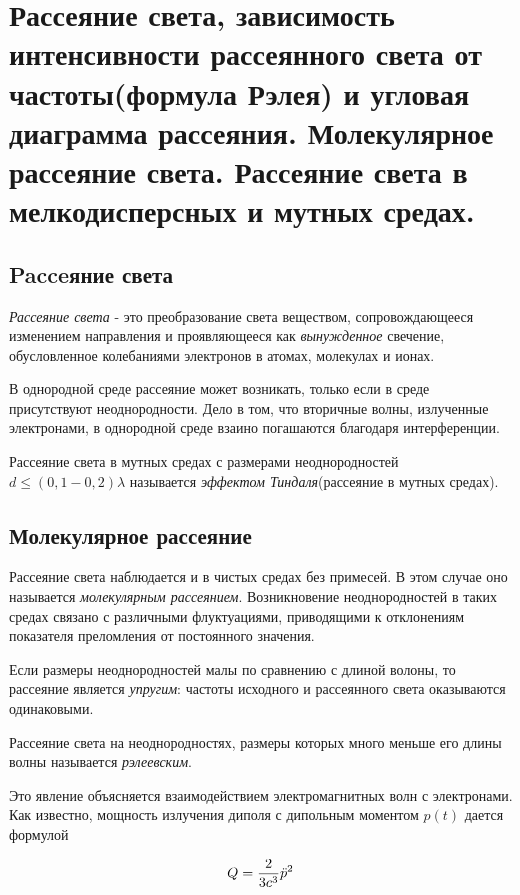 \section{Рассеяние света, зависимость интенсивности рассеянного света от частоты(формула Рэлея) и угловая диаграмма рассеяния. Молекулярное рассеяние света. Рассеяние света в мелкодисперсных и мутных средах. }


\subsection{Pacceяние света}

\textit{Рассеяние света} - это преобразование света веществом, сопровождающееся изменением направления и проявляющееся как \textit{вынужденное} свечение, обусловленное колебаниями электронов в атомах, молекулах и ионах.

В однородной среде рассеяние может возникать, только если в среде присутствуют неоднородности. Дело в том, что вторичные волны, излученные электронами, в однородной среде взаино погашаются благодаря интерференции.

Рассеяние света в мутных средах с размерами неоднородностей $d\leq(0,1-0,2)\lambda$ называется \textit{эффектом Тиндаля}(рассеяние в мутных средах).



\subsection{Молекулярное рассеяние}

Рассеяние света наблюдается и в чистых средах без примесей. В этом случае оно называется \textit{молекулярным рассеянием}. Возникновение неоднородностей в таких средах связано с различными флуктуациями, приводящими к отклонениям показателя преломления от постоянного значения.

Если размеры неоднородностей малы по сравнению с длиной волоны, то рассеяние является \textit{упругим}: частоты исходного и рассеянного света оказываются одинаковыми.

Рассеяние света на неоднородностях, размеры которых много меньше его длины волны называется \textit{рэлеевским}.

Это явление объясняется взаимодействием электромагнитных волн с электронами. Как известно, мощность излучения диполя с дипольным моментом $p(t)$ дается формулой

\begin{equation*}
    Q = \frac{2}{3c^3}\Ddot{p}^2
\end{equation*}

